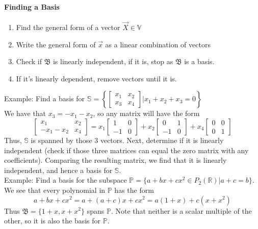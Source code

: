 \documentclass[10pt,letter]{article}
\begin{document}
\paragraph{Finding a Basis}
\begin{enumerate}
    \item Find the general form of a vector $\vec{X}\in\mathbb{V}$ 
    \item Write the general form of $\vec{x}$ as a linear combination of vectors 
    \item Check if $\mathfrak{B}$ is linearly independent, if it is, stop as $\mathfrak{B}$ is a basis.
    \item If it's linearly dependent, remove vectors until it is. 
\end{enumerate} 
Example: Find a basis for $\mathbb{S}=\left\{\begin{bmatrix}x_1&x_2\\x_3&x_4\end{bmatrix}|x_1+x_2+x_3=0\right\}$ \\ 
We have that $x_3=-x_1-x_2$, so any matrix will have the form $$\begin{bmatrix}x_1&x_2\\-x_1-x_2&x_4\end{bmatrix}=x_1\begin{bmatrix}1&0\\-1&0\end{bmatrix}+x_2\begin{bmatrix}0&1\\-1&0\end{bmatrix}+x_4\begin{bmatrix}0&0\\0&1\end{bmatrix}$$ Thus, $\mathbb{S}$ is spanned by those 3 vectors. Next, determine if it is linearly independent (check if those three matrices can equal the zero matrix with any coefficients). Comparing the resulting matrix, we find that it is linearly independent, and hence a basis for $\mathbb{S}$. \\ 
Example: Find a basis for the subspace $\mathbb{P}=\{a+bx+cx^2\in P_2(\mathbb{R})|a+c=b\}$.\\ 
We see that every polynomial in $\mathbb{P}$ has the form $$a+bx+cx^2=a+(a+c)x+cx^2=a(1+x)+c(x+x^2)$$ Thus $\mathfrak{B}=\{1+x,x+x^2\}$ spans $\mathbb{P}$. Note that neither is a scalar multiple of the other, so it is also the basis for $\mathbb{P}$. 
\end{document}
